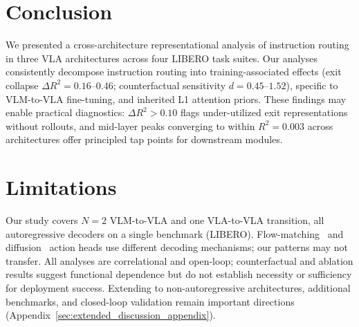 \section{Conclusion}
\label{sec:conclusion}

We presented a cross-architecture representational analysis of instruction routing in three VLA architectures across four LIBERO task suites.
Our analyses consistently decompose instruction routing into training-associated effects (exit collapse $\Delta R^2 = 0.16$--$0.46$; counterfactual sensitivity $d = 0.45$--$1.52$), specific to VLM-to-VLA fine-tuning, and inherited L1 attention priors.
These findings may enable practical diagnostics: $\Delta R^2 > 0.10$ flags under-utilized exit representations without rollouts, and mid-layer peaks converging to within $R^2 = 0.003$ across architectures offer principled tap points for downstream modules.

\section{Limitations}
\label{sec:limitations}

Our study covers $N{=}2$ VLM-to-VLA and one VLA-to-VLA transition, all autoregressive decoders on a single benchmark (LIBERO).
Flow-matching~\cite{black2024_pi0} and diffusion~\cite{ghosh2024_octo} action heads use different decoding mechanisms; our patterns may not transfer.
All analyses are correlational and open-loop; counterfactual and ablation results suggest functional dependence but do not establish necessity or sufficiency for deployment success.
Extending to non-autoregressive architectures, additional benchmarks, and closed-loop validation remain important directions (Appendix~\ref{sec:extended_discussion_appendix}).
